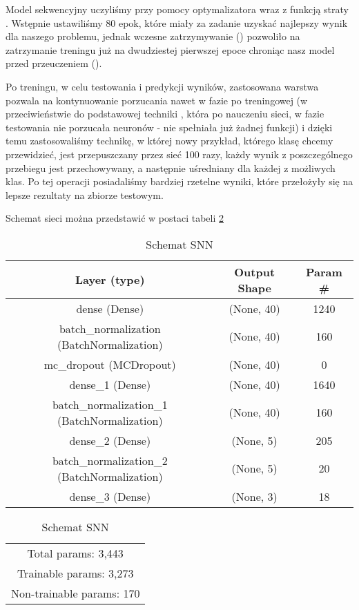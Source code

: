         Model sekwencyjny uczyliśmy przy pomocy optymalizatora  \cite{adam} \cite{nadam} wraz z funkcją straty . Wstępnie ustawiliśmy 80 epok, które miały za zadanie uzyskać najlepszy wynik dla naszego problemu, jednak wczesne zatrzymywanie () pozwoliło na zatrzymanie treningu już na dwudziestej pierwszej epoce chroniąc nasz model przed przeuczeniem ().
        
        Po treningu, w celu testowania i predykcji wyników, zastosowana warstwa  pozwala na kontynuowanie porzucania nawet w fazie po treningowej (w przeciwieństwie do podstawowej techniki , która po nauczeniu sieci, w fazie testowania nie porzucała neuronów - nie spełniała już żadnej funkcji) i dzięki temu zastosowaliśmy technikę, w której nowy przykład, którego klasę chcemy przewidzieć, jest przepuszczany przez sieć 100 razy, każdy wynik z poszczególnego przebiegu jest przechowywany, a następnie uśredniany dla każdej z możliwych klas. Po tej operacji posiadaliśmy bardziej rzetelne wyniki, które przełożyły się na lepsze rezultaty na zbiorze testowym.
        
        Schemat sieci można przedstawić w postaci tabeli \ref{tab:SNNTable}
        \begin{table}[H]
            \centering
            \caption{Schemat SNN}
            \label{tab:SNNTable}
            \begin{tabular}{|c|c|c|}
            \hline
                Layer (type) &  Output Shape & Param \#\\ \hline \hline
                dense (Dense) & (None, 40) & 1240 \\ \hline
                batch\_normalization (BatchNormalization) & (None, 40) & 160 \\ \hline 
                mc\_dropout (MCDropout) & (None, 40) & 0 \\ \hline         
                dense\_1 (Dense) & (None, 40) & 1640 \\ \hline      
                batch\_normalization\_1 (BatchNormalization) & (None, 40) & 160 \\ \hline
                dense\_2 (Dense) & (None, 5) &  205 \\ \hline       
                batch\_normalization\_2 (BatchNormalization)  & (None, 5) &  20 \\ \hline
                dense\_3 (Dense) & (None, 3) &  18 \\ \hline \hline 
            \end{tabular}
            	\begin{tabular} {| c |}
                Total params: 3,443 \\
                Trainable params: 3,273 \\
                Non-trainable params: 170 \\
                \hline
                \end{tabular}
        \end{table}
